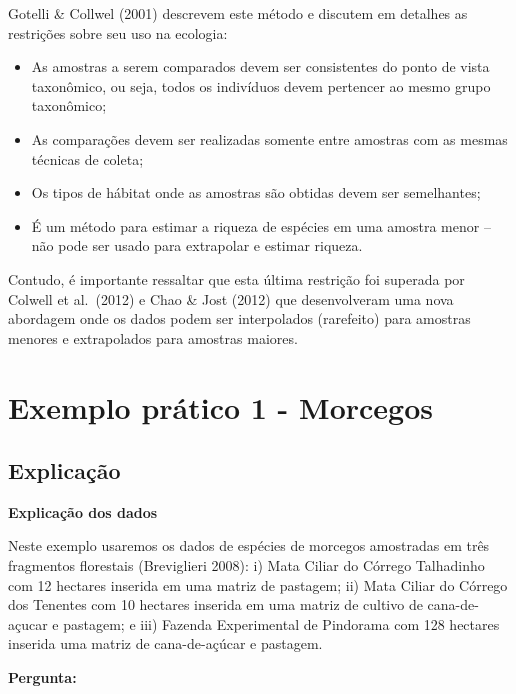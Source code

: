\documentclass[
]{book}
\providecommand{\tightlist}{%
  \setlength{\itemsep}{0pt}\setlength{\parskip}{0pt}}
\begin{document}
Gotelli \& Collwel (2001) descrevem este método e discutem em detalhes as restrições sobre seu uso na ecologia:

\begin{itemize}
\tightlist
\item
  As amostras a serem comparados devem ser consistentes do ponto de vista taxonômico, ou seja, todos os indivíduos devem pertencer ao mesmo grupo taxonômico;\\
\item
  As comparações devem ser realizadas somente entre amostras com as mesmas técnicas de coleta;\\
\item
  Os tipos de hábitat onde as amostras são obtidas devem ser semelhantes;\\
\item
  É um método para estimar a riqueza de espécies em uma amostra menor -- não pode ser usado para extrapolar e estimar riqueza.
\end{itemize}

Contudo, é importante ressaltar que esta última restrição foi superada por Colwell et al.~(2012) e Chao \& Jost (2012) que desenvolveram uma nova abordagem onde os dados podem ser interpolados (rarefeito) para amostras menores e extrapolados para amostras maiores.

\hypertarget{exemplo-pruxe1tico-1---morcegos}{%
\section{Exemplo prático 1 - Morcegos}\label{exemplo-pruxe1tico-1---morcegos}}

\hypertarget{explicauxe7uxe3o}{%
\subsection{Explicação}\label{explicauxe7uxe3o}}

\textbf{Explicação dos dados}

Neste exemplo usaremos os dados de espécies de morcegos amostradas em três fragmentos florestais (Breviglieri 2008): i) Mata Ciliar do Córrego Talhadinho com 12 hectares inserida em uma matriz de pastagem; ii) Mata Ciliar do Córrego dos Tenentes com 10 hectares inserida em uma matriz de cultivo de cana-de-açucar e pastagem; e iii) Fazenda Experimental de Pindorama com 128 hectares inserida uma matriz de cana-de-açúcar e pastagem.

\textbf{Pergunta:}
\end{document}
